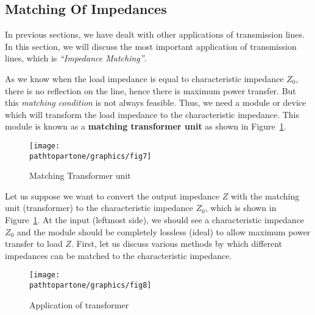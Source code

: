 \subsection{Matching Of Impedances}\label{lec:lec12}
In previous sections, we have dealt with other applications of transmission lines. In this section, we will discuss the most important application of transmission lines, which is \emph{\textquotedblleft Impedance Matching\textquotedblright}.

As we know when the load impedance is equal to characteristic impedance $Z_0$, there is no reflection on the line, hence there is maximum power transfer. But this \textit{matching condition} is not always feasible. Thus, we need a module or device which will transform the load impedance to the characteristic impedance. This module is known as a \textbf{matching transformer unit} as shown in Figure~\ref{fig:fig7}.
\begin{figure}[h]
\centering
\texttt{[image: \\pathtopartone/graphics/fig7]}
\caption{Matching Transformer unit}
\label{fig:fig7}
\end{figure} 

Let us suppose we want to convert the output impedance $Z$ with the matching unit (transformer) to the characteristic impedance $Z_0$, which is shown in Figure~\ref{fig:fig7}. At the input (leftmost side), we should see a characteristic impedance $ Z_0$ and the module should be completely lossless (ideal) to allow maximum power transfer to load $Z$. First, let us discuss various methods by which different impedances can be matched to the characteristic impedance.
\begin{figure}[h]
\centering
\texttt{[image: \\pathtopartone/graphics/fig8]}
\caption{Application of transformer}
\label{fig:fig8}
\end{figure}

